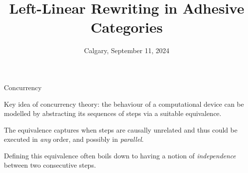 \documentclass[usenames,dvipsnames]{beamer}
\title{Left-Linear Rewriting in Adhesive Categories}
\date[May 1977]{Calgary, September 11, 2024}
\begin{document}
	\maketitle 


\begin{frame}{Concurrency}\justifying
	

	
	Key  idea of concurrency theory:  the behaviour of a computational
	device can be modelled by abstracting its sequences of steps via a suitable equivalence.
	
	\pause 
	\medskip 
	The equivalence captures when steps are causally unrelated and thus could be
	executed in \emph{any} order, and possibly in \emph{parallel}.
	
	\pause 
	\medskip 
	Defining this equivalence often boils down to having a notion
	of \emph{independence} between two consecutive steps. 
	
	
\end{frame}
\end{document}
